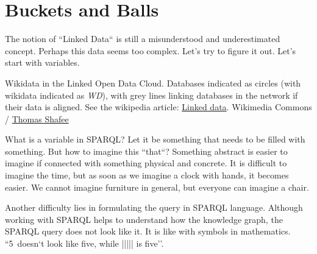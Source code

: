 
\setchapterpreamble[u]{\margintoc}
\chapter{Buckets and Balls\protect\footnotemark}


The notion of ``Linked Data`` is still a misunderstood and underestimated concept. Perhaps this data seems too complex.
Let's try to figure it out. Let's start with variables.

\begin{marginfigure}[-1.5cm]
	{
		\setlength{\fboxsep}{0pt}%
		\setlength{\fboxrule}{1pt}%
	}
    \caption[Wikidata in the Linked Open Data Cloud]{Wikidata in the Linked Open Data Cloud. Databases indicated as circles (with wikidata indicated as \textit{WD}), with grey lines linking databases in the network if their data is aligned. See the wikipedia article: \href{https://en.wikipedia.org/wiki/Linked_data}{Linked data}. Wikimedia Commons / \href{https://commons.wikimedia.org/wiki/File:Wikidata_in_the_Linked_Open_Data_cloud_2020-08-20.svg}{Thomas Shafee}}
	\label{fig:Wikidata_in_linked_open_data}
\end{marginfigure}

What is a variable in SPARQL? Let it be something that needs to be filled with something. But how to imagine this ``that``? Something abstract is easier to imagine if connected with something physical and concrete. It is difficult to imagine the time, but as soon as we imagine a clock with hands, it becomes easier. We cannot imagine furniture in general, but everyone can imagine a chair. 

Another difficulty lies in formulating the query in SPARQL language. Although working with SPARQL helps to understand how the knowledge graph, the SPARQL query does not look like it. It is like with symbols in mathematics. ``5~doesn`t look like five, while ||||| is five''.

